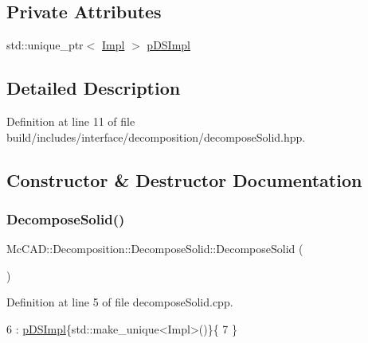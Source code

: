 \subsection*{Private Attributes}
\begin{DoxyCompactItemize}
\item 
std\+::unique\+\_\+ptr$<$ \hyperlink{classMcCAD_1_1Decomposition_1_1DecomposeSolid_1_1Impl}{Impl} $>$ \hyperlink{classMcCAD_1_1Decomposition_1_1DecomposeSolid_a7f822ce5590860062e38dca471847bcc}{p\+D\+S\+Impl}
\end{DoxyCompactItemize}


\subsection{Detailed Description}


Definition at line 11 of file build/includes/interface/decomposition/decompose\+Solid.\+hpp.



\subsection{Constructor \& Destructor Documentation}
\mbox{\label{classMcCAD_1_1Decomposition_1_1DecomposeSolid_a667ae32abac46338589582ab37623f6f}} 
\subsubsection{\texorpdfstring{Decompose\+Solid()}{DecomposeSolid()}\hspace{0.1cm}{\footnotesize\ttfamily [1/2]}}
{\footnotesize\ttfamily Mc\+C\+A\+D\+::\+Decomposition\+::\+Decompose\+Solid\+::\+Decompose\+Solid (\begin{DoxyParamCaption}{ }\end{DoxyParamCaption})}



Definition at line 5 of file decompose\+Solid.\+cpp.


\begin{DoxyCode}
6   : \hyperlink{classMcCAD_1_1Decomposition_1_1DecomposeSolid_a7f822ce5590860062e38dca471847bcc}{pDSImpl}\{std::make\_unique<Impl>()\}\{
7 \}
\end{DoxyCode}
\mbox{\label{classMcCAD_1_1Decomposition_1_1DecomposeSolid_ac8c691a04b01f5238acc8600255f2f46}} 
